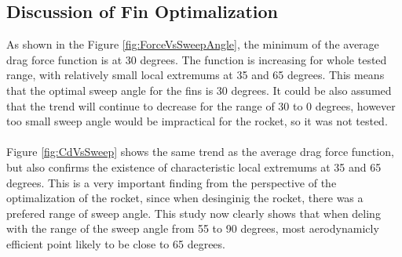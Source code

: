 \documentclass{article}
\begin{document}
\subsection{Discussion of Fin Optimalization}
As shown in the Figure \ref{fig:ForceVsSweepAngle}, the minimum of the average drag force function is at 30 degrees. The function
is increasing for whole tested range, with relatively small local extremums at 35 and 65 degrees. This
means that the optimal sweep angle for the fins is 30 degrees. It could be also assumed that the
trend will continue to decrease for the range of 30 to 0 degrees, however too small sweep angle
would be impractical for the rocket, so it was not tested.\\\\

Figure \ref{fig:CdVsSweep} shows the same trend as the average drag force function, but 
also confirms the existence of characteristic local extremums at 35 and 65 degrees. This is a very
 important finding from the perspective of the optimalization of the rocket, since when desinginig 
the rocket, there was a prefered range of sweep angle. This study now clearly shows that when 
deling with the range of the sweep angle from 55 to 90 degrees, most aerodynamicly efficient
point likely to be close to 65 degrees.
\end{document}
